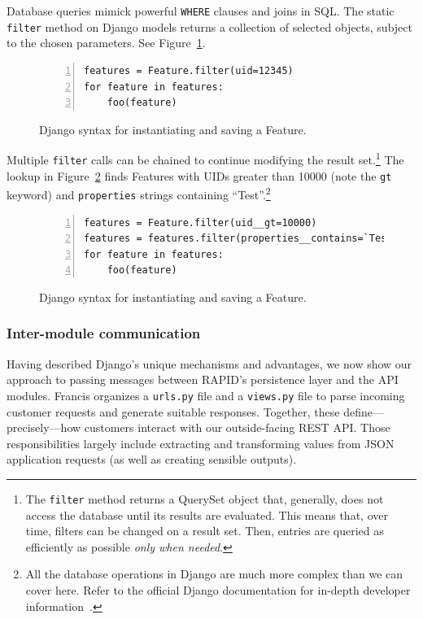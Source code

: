 Database queries mimick powerful \texttt{WHERE} clauses and joins in SQL. The static \texttt{filter} method on Django models returns a collection of selected objects, subject to the chosen parameters. See Figure~\ref{fig:filter1}.

\begin{figure}[ht]
\begin{Verbatim}[samepage=true,baselinestretch=1,numbers=left,xleftmargin=12mm]
features = Feature.filter(uid=12345)
for feature in features:
    foo(feature)
\end{Verbatim}
\caption{Django syntax for instantiating and saving a Feature.}
\label{fig:filter1}
\end{figure}

Multiple \texttt{filter} calls can be chained to continue modifying the result set.\footnote{The \texttt{filter} method returns a QuerySet object that, generally, does not access the database until its results are evaluated. This means that, over time, filters can be changed on a result set. Then, entries are queried as efficiently as possible \textit{only when needed}.} The lookup in Figure~\ref{fig:filter2} finds Features with UIDs greater than 10000 (note the \texttt{gt} keyword) and \texttt{properties} strings containing ``Test''.\footnote{All the database operations in Django are much more complex than we can cover here. Refer to the official Django documentation for in-depth developer information~\cite{GeoDb}.}

\begin{figure}[ht]
\begin{Verbatim}[samepage=true,baselinestretch=1,numbers=left,xleftmargin=12mm]
features = Feature.filter(uid__gt=10000)
features = features.filter(properties__contains=`Test')
for feature in features:
    foo(feature)
\end{Verbatim}
\caption{Django syntax for instantiating and saving a Feature.}
\label{fig:filter2}
\end{figure}

\subsubsection{Inter-module communication}
Having described Django's unique mechanisms and advantages, we now show our approach to passing messages between RAPID's persistence layer and the API modules. Francis organizes a \texttt{urls.py} file and a \texttt{views.py} file to parse incoming customer requests and generate suitable responses. Together, these define---precisely---how customers interact with our outside-facing REST API. Those responsibilities largely include extracting and transforming values from JSON application requests (as well as creating sensible outputs).

